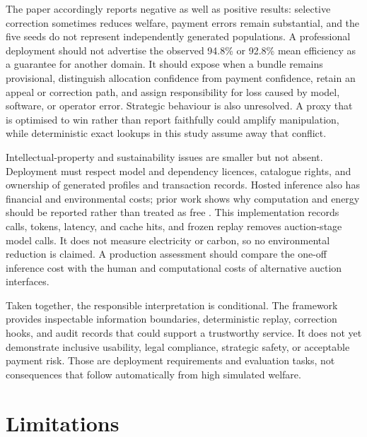 The paper accordingly reports negative as well as positive results: selective
correction sometimes reduces welfare, payment errors remain substantial, and
the five seeds do not represent independently generated populations. A
professional deployment should not advertise the observed 94.8\% or 92.8\%
mean efficiency as a guarantee for another domain. It should expose when a
bundle remains provisional, distinguish allocation confidence from payment
confidence, retain an appeal or correction path, and assign responsibility
for loss caused by model, software, or operator error. Strategic behaviour is
also unresolved. A proxy that is optimised to win rather than report faithfully
could amplify manipulation, while deterministic exact lookups in this study
assume away that conflict.

Intellectual-property and sustainability issues are smaller but not absent.
Deployment must respect model and dependency licences, catalogue rights, and
ownership of generated profiles and transaction records. Hosted inference also
has financial and environmental costs; prior work shows why computation and
energy should be reported rather than treated as free \citep{strubell2019energy}.
This implementation records calls, tokens, latency, and cache hits, and frozen
replay removes auction-stage model calls. It does not measure electricity or
carbon, so no environmental reduction is claimed. A production assessment
should compare the one-off inference cost with the human and computational
costs of alternative auction interfaces.

Taken together, the responsible interpretation is conditional. The framework
provides inspectable information boundaries, deterministic replay, correction
hooks, and audit records that could support a trustworthy service. It does not
yet demonstrate inclusive usability, legal compliance, strategic safety, or
acceptable payment risk. Those are deployment requirements and evaluation
tasks, not consequences that follow automatically from high simulated welfare.

\section{Limitations}


